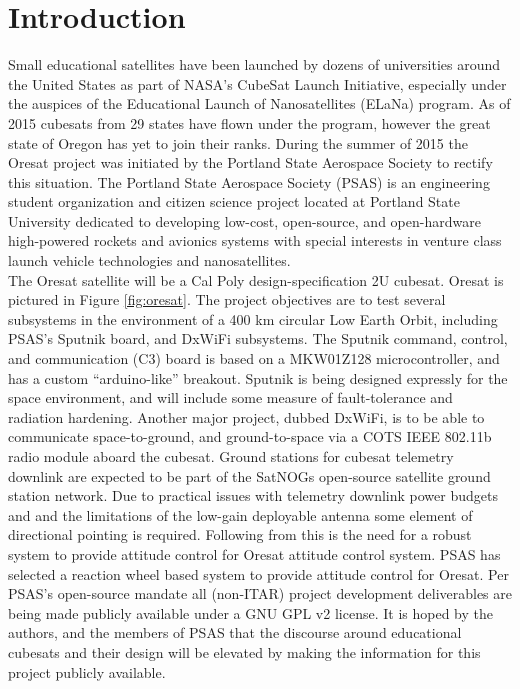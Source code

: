 \documentclass[]{aiaa-tc}%
\begin{document}
\section{Introduction}
Small educational satellites have been launched by dozens of universities around the United States as part of NASA’s CubeSat Launch Initiative, especially under the auspices of the Educational Launch of Nanosatellites (ELaNa) program. As of 2015 cubesats from 29 states have flown under the program, however the great state of Oregon has yet to join their ranks\cite{Mahoney:15bk}. During the summer of 2015 the Oresat project was initiated by the Portland State Aerospace Society to rectify this situation. The Portland State Aerospace Society (PSAS) is an engineering student organization and citizen science project located at Portland State University dedicated to developing low-cost, open-source, and open-hardware high-powered rockets and avionics systems with special interests in venture class launch vehicle technologies and nanosatellites\cite{PSAS:15bk}.\\

The Oresat satellite will be a Cal Poly design-specification 2U cubesat\cite{Cubesat:14bk}. Oresat is pictured in Figure \ref{fig:oresat}. The project objectives are to test several subsystems in the environment of a 400 km circular Low Earth Orbit, including PSAS’s Sputnik board, and DxWiFi subsystems. The Sputnik command, control, and communication (C3) board is based on a MKW01Z128 microcontroller, and has a custom “arduino-like” breakout. Sputnik is being designed expressly for the space environment, and will include some measure of fault-tolerance and radiation hardening. Another major project, dubbed DxWiFi, is to be able to communicate space-to-ground, and ground-to-space via a COTS IEEE 802.11b radio module aboard the cubesat. Ground stations for cubesat telemetry downlink are expected to be part of the SatNOGs open-source satellite ground station network. Due to practical issues with telemetry downlink power budgets and and the limitations of the low-gain deployable antenna some element of directional pointing is required. Following from this is the need for a robust system to provide attitude control for Oresat attitude control system. PSAS has selected a reaction wheel based system to provide attitude control for Oresat. Per PSAS’s open-source mandate all  (non-ITAR) project development deliverables are being made publicly available under a GNU GPL v2 license\cite{Oresat:15bk}. It is hoped by the authors, and the members of PSAS that the discourse around educational cubesats and their design will be elevated by making the information for this project publicly available.
\end{document}
